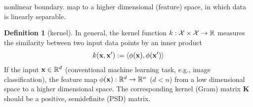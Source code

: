 \documentclass[
10pt,
aps,
pra,
linenumbers,
floatfix,
]{revtex4-2}
\theoremstyle{plain}
\theoremstyle{definition}
\newtheorem{definition}{Definition}
\newcommand{\kernel}{k}
\begin{document}
nonlinear boundary. map to a higher dimensional (feature) space, in which data is linearly separable.
\begin{definition}[kernel]\label{def:kernel}
	In general, the kernel function $\kernel:\mathcal{X}\times \mathcal{X} \to \realnumber$ measures the similarity between two input data points by an inner product
	\begin{equation}
		\kernel (\vbx,\vbx') : = \expval{\phi(\vbx),\phi(\vbx')}
	\end{equation}
	If the input $\vb{x}\in \mathbb{R}^d$ (conventional machine learning task, e.g., image classification), the feature map $\phi(\vb{x}): \mathbb{R}^d\to \mathbb{R}^n$ ($d < n$) from a low dimensional space to a higher dimensional space.
	The corresponding kernel (Gram) matrix $\mathbf{K}$ should be a positive, semidefinite (PSD) matrix.
\end{definition}
\end{document}

